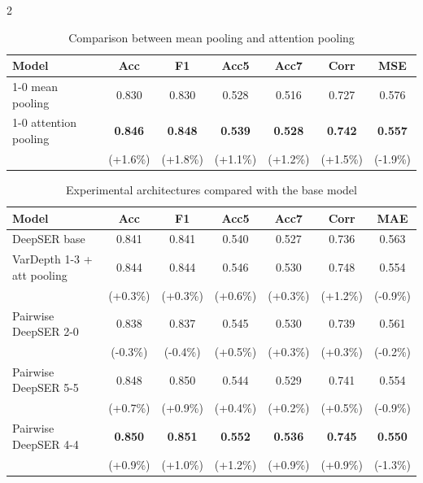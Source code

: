 \documentclass[10pt]{article}
\begin{document}
\begin{multicols}{2}
\begin{table}[htbp]
    \centering
    \caption{Comparison between mean pooling and attention pooling}
    \label{tab:pool}
    \begin{tabular}{lcccccc}
    \toprule
    Model & Acc & F1 & Acc5 & Acc7 & Corr & MSE \\
    \midrule
    1-0 mean pooling & 0.830 & 0.830 & 0.528 & 0.516 & 0.727 & 0.576 \\
    1-0 attention pooling & \textbf{0.846} & \textbf{0.848} & \textbf{0.539} & \textbf{0.528} & \textbf{0.742} & \textbf{0.557} \\
     & (+1.6\%) & (+1.8\%) & (+1.1\%) & (+1.2\%) & (+1.5\%) & (-1.9\%) \\
    \bottomrule
    \end{tabular}
\end{table}
    
\begin{table}[t]
    \centering
    \caption{Experimental architectures compared with the base model}
    \label{tab:arch}
    \begin{tabular}{lcccccc}
    \toprule
    Model & Acc & F1 & Acc5 & Acc7 & Corr & MAE \\
    \midrule
    DeepSER base & 0.841 & 0.841 & 0.540 & 0.527 & 0.736 & 0.563 \\
    \addlinespace
    VarDepth 1-3 + att pooling & 0.844 & 0.844 & 0.546 & 0.530 & 0.748 & 0.554 \\
     & \footnotesize{(+0.3\%)} & \footnotesize{(+0.3\%)} & \footnotesize{(+0.6\%)} & \footnotesize{(+0.3\%)} & \footnotesize{(+1.2\%)} & \footnotesize{(-0.9\%)} \\
    \addlinespace
    Pairwise DeepSER 2-0 & 0.838 & 0.837 & 0.545 & 0.530 & 0.739 & 0.561 \\
     & \footnotesize{(-0.3\%)} & \footnotesize{(-0.4\%)} & \footnotesize{(+0.5\%)} & \footnotesize{(+0.3\%)} & \footnotesize{(+0.3\%)} & \footnotesize{(-0.2\%)} \\
    \addlinespace
    Pairwise DeepSER 5-5 & 0.848 & 0.850 & 0.544 & 0.529 & 0.741 & 0.554 \\
     & \footnotesize{(+0.7\%)} & \footnotesize{(+0.9\%)} & \footnotesize{(+0.4\%)} & \footnotesize{(+0.2\%)} & \footnotesize{(+0.5\%)} & \footnotesize{(-0.9\%)} \\
    \addlinespace
    Pairwise DeepSER 4-4 & \textbf{0.850} & \textbf{0.851} & \textbf{0.552} & \textbf{0.536} & \textbf{0.745} & \textbf{0.550} \\
     & \footnotesize{(+0.9\%)} & \footnotesize{(+1.0\%)} & \footnotesize{(+1.2\%)} & \footnotesize{(+0.9\%)} & \footnotesize{(+0.9\%)} & \footnotesize{(-1.3\%)} \\
    \bottomrule
    \end{tabular}
\end{table}


\end{multicols}
\end{document}
